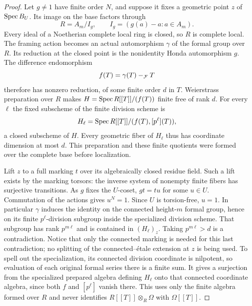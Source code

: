 \begin{proof}
Let $g\ne1$ have finite order $N$, and suppose it fixes a geometric
point $z$ of $\operatorname{Spec} B_U$.  Its image on the base factors through
\[
 R=A_m/I_g,\qquad I_g=(g(a)-a:a\in A_m).
\]
Every ideal of a Noetherian complete local ring is closed, so $R$
is complete local.  The framing action becomes an actual
automorphism $\gamma$ of the formal group over $R$.  Its reduction
at the closed point is the nonidentity Honda automorphism $g$.
The difference endomorphism
\[
 f(T)=\gamma(T)-_{\mathcal F}T
\]
therefore has nonzero reduction, of some finite order $d$ in $T$.
Weierstrass preparation over $R$ makes
$H=\operatorname{Spec} R[[T]]/(f(T))$ finite free of rank $d$.
For every $\ell$ the fixed subscheme of the finite division scheme is
\[
 H_\ell=\operatorname{Spec} R[[T]]/(f(T),[p^\ell](T)),
\]
a closed subscheme of $H$.  Every geometric fiber of $H_\ell$ thus
has coordinate dimension at most $d$.  This preparation and these
finite quotients were formed over the complete base before
localization.

Lift $z$ to a full marking $t$ over its algebraically closed residue
field.  Such a lift exists by the marking torsors: the inverse
system of nonempty finite fibers has surjective transitions.  As
$g$ fixes the $U$-coset, $gt=tu$ for some $u\in U$.  Commutation
of the actions gives $u^N=1$.  Since $U$ is torsion-free, $u=1$.
In particular $\gamma$ induces the identity on the connected
height-$m$ formal group, hence on its finite $p^\ell$-division
subgroup inside the specialized division scheme.  That subgroup
has rank $p^{m\ell}$ and is contained in $(H_\ell)_z$.  Taking
$p^{m\ell}>d$ is a contradiction.  Notice that only the connected
marking is needed for this last contradiction; no splitting of
the connected--\'{e}tale extension at $z$ is being used.
To spell out the specialization, its connected division coordinate
is nilpotent, so evaluation of each original formal series there
is a finite sum.  It gives a surjection from the specialized
prepared algebra defining $H_\ell$ onto that connected coordinate
algebra, since both $f$ and $[p^\ell]$ vanish there.  This uses only
the finite algebra formed over $R$ and never identifies
$R[[T]]\otimes_R\Omega$ with $\Omega[[T]]$.


\end{proof}
